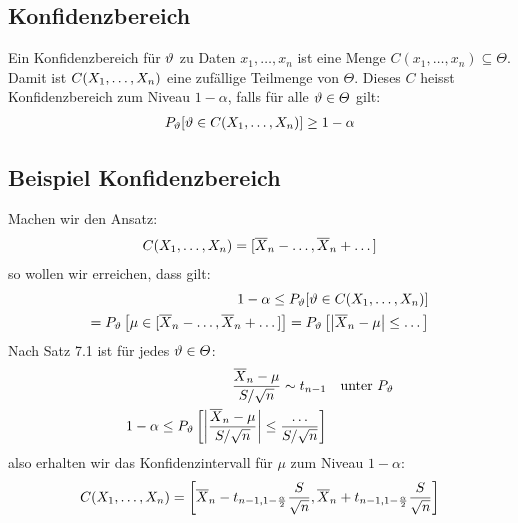 \subsection*{Konfidenzbereich}
Ein Konfidenzbereich für $\vartheta$ zu Daten $x_1, \dots, x_n$ ist eine Menge $C
  (x_1, \dots, x_n) \subseteq \varTheta$. Damit ist $C (X_1, \dots, X_n)$ eine
zufällige Teilmenge von $\varTheta$. Dieses $C$ heisst Konfidenzbereich zum
Niveau $1 - \alpha$, falls für alle $\vartheta \in \varTheta$ gilt:
\begin{align*}
  P_\vartheta [\vartheta \in C (X_1, \dots, X_n)] \geq 1 - \alpha
\end{align*}
\subsection*{Beispiel Konfidenzbereich}
Machen wir den Ansatz:
\begin{align*}
  C (X_1, \dots, X_n) = [\overline{X}_n - \dots, \overline{X}_n + \dots]
\end{align*}
so wollen wir erreichen, dass gilt:
\begin{align*}
  1 - \alpha \leq P_\vartheta[\vartheta \in  C (X_1, \dots, X_n)] \\
  = P_\vartheta \left[ \mu \in [\overline{X}_n - \dots, \overline{X}_n + \dots] \right]
  = P_\vartheta \left[ \abs{\overline{X}_n - \mu} \leq \dots \right]
\end{align*}
Nach Satz 7.1 ist für jedes $\vartheta \in \varTheta$:
\begin{align*}
  \frac{\overline{X}_n - \mu}{S / \sqrt{n}} \sim t_{n-1} &  & \text{unter } P_\vartheta \\
  1 - \alpha \leq P_\vartheta \left[ \abs{\frac{\overline{X}_n - \mu}{S / \sqrt{n}}} \leq \frac{\dots}{S / \sqrt{n}} \right]
\end{align*}
also erhalten wir das Konfidenzintervall für $\mu$ zum Niveau $1 - \alpha$:
\begin{align*}
  C (X_1, \dots, X_n) = \left[ \overline{X}_n - t_{n-1, 1 - \frac{\alpha}{2}} \frac{S}{\sqrt{n}}, \overline{X}_n + t_{n-1, 1 - \frac{\alpha}{2}} \frac{S}{\sqrt{n}} \right]
\end{align*}
